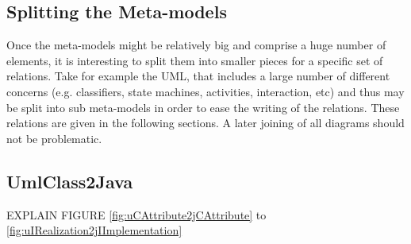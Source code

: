 \documentclass[tuberlin,cic,tc,english,noabntcite]{iiufrgs}
\begin{document}
\subsection{Splitting the Meta-models}
Once the meta-models might be relatively big and comprise a huge number of elements, it is interesting to split them into smaller pieces for a specific set of relations. Take for example the UML, that includes a large number of different concerns (e.g. classifiers, state machines, activities, interaction, etc) and thus may be split into sub meta-models in order to ease the writing of the relations. These relations are given in the following sections. A later joining of all diagrams should not be problematic.

\subsection{UmlClass2Java}
EXPLAIN FIGURE \ref{fig:uCAttribute2jCAttribute} to \ref{fig:uIRealization2jIImplementation}
\end{document}
